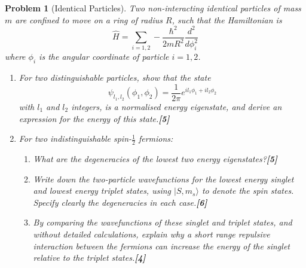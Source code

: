 \documentclass[a4paper]{article}
\theoremstyle{new}
\newtheorem{qns}{Problem}[subsection]
\begin{document}
\begin{qns}[Identical Particles]
Two non-interacting identical particles of mass $m$ are confined to move on a ring of radius $R$, such that the Hamiltonian is
$$\hat{H}=\sum_{i=1,2}-\frac{\hbar^2}{2mR^2}\frac{d^2}{d\phi_i^2}$$
where $\phi_i$ is the angular coordinate of particle $i = 1, 2$.
\begin{enumerate}[label=(\roman*)]
\item For two distinguishable particles, show that the state
$$\psi_{l_1,l_2}(\phi_1,\phi_2)=\frac{1}{2\pi}e^{il_1\phi_1+il_2\phi_2}$$
with $l_1$ and $l_2$ integers, is a normalised energy eigenstate, and derive an expression for the energy of this state.\hfill\textbf{[5]}
\item For two indistinguishable spin-$\frac{1}{2}$ fermions:
\begin{enumerate}[label=(\alph*)]
    \item What are the degeneracies of the lowest two energy eigenstates?\hfill\textbf{[5]}
    \item Write down the two-particle wavefunctions for the lowest energy singlet and lowest energy triplet states, using $|S,m_s\rangle$ to denote the spin states. Specify clearly the degeneracies in each case.\hfill\textbf{[6]}
    \item By comparing the wavefunctions of these singlet and triplet states, and without detailed calculations, explain why a short range repulsive interaction between the fermions can increase the energy of the singlet relative to the triplet states.\hfill\textbf{[4]}
\end{enumerate}
\end{enumerate}
\end{qns}
\newpage
\end{document}
